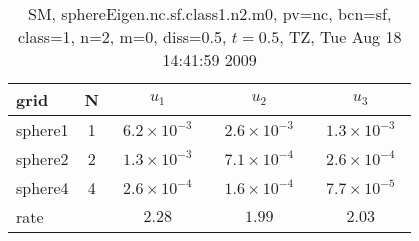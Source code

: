 \begin{table}[hbt]\tableFont %
\begin{center}
\begin{tabular}{|l|c|c|c|c|} \hline 
grid  & N &  $u_1$ & $u_2$ & $u_3$  \\ \hline 
             sphere1 &     1 & ~$6.2\times10^{ -3}$~ & ~$2.6\times10^{ -3}$~ & ~$1.3\times10^{ -3}$~  \\ \hline
             sphere2 &     2 & ~$1.3\times10^{ -3}$~ & ~$7.1\times10^{ -4}$~ & ~$2.6\times10^{ -4}$~  \\ \hline
             sphere4 &     4 & ~$2.6\times10^{ -4}$~ & ~$1.6\times10^{ -4}$~ & ~$7.7\times10^{ -5}$~  \\ \hline
    rate             &       &       $2.28$          &       $1.99$          &       $2.03$           \\ \hline
\end{tabular}
\caption{SM, sphereEigen.nc.sf.class1.n2.m0, pv=nc, bcn=sf, class=1, n=2, m=0, diss=0.5, $t=0.5$,  TZ, Tue Aug 18 14:41:59 2009}\label{table:sphereEigen.nc.sf.class1.n2.m0}
\end{center}
\end{table}

